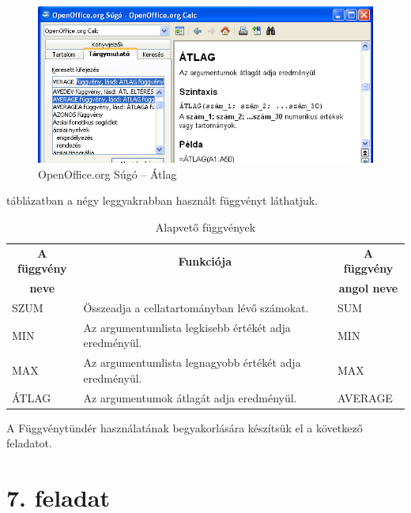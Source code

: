 \begin{figure}[!h]
\begin{center}
\includegraphics[width=13.193cm]{oocalcv2-img34.png}
\caption{OpenOffice.org Súgó --  Átlag}\label{SúgóÁtlag}
\end{center}
\end{figure}

 táblázatban a négy leggyakrabban használt
függvényt láthatjuk.

\begin{table}[!h]
\begin{center}
\caption{Alapvető függvények}\label{AlapvetőFüggvények}
\begin{tabular}{|m{2.5cm}|m{8cm}|m{3cm}|}
\hline
\multicolumn{1}{|c|}{\textbf{A függvény}}&
\multicolumn{1}{c|}{\textbf{Funkciója}}&
\multicolumn{1}{c|}{\textbf{A függvény}} \\
\multicolumn{1}{|c|}{\textbf{neve}} & &
\multicolumn{1}{c|}{\textbf{angol neve}} \\
\hline
SZUM & Összeadja a cellatartományban lévő számokat. & SUM \\
\hline
MIN & Az argumentumlista legkisebb értékét adja eredményül. & MIN \\
\hline
MAX & Az argumentumlista legnagyobb értékét adja eredményül. & MAX \\   
\hline
ÁTLAG & Az argumentumok átlagát adja eredményül. & AVERAGE \\
\hline
\end{tabular}
\end{center}
\end{table}

A Függvénytündér használatának begyakorlására
készítsük el a következő feladatot.


\section{7. feladat}

